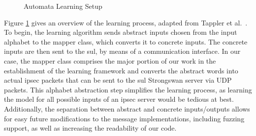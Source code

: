 \begin{figure}[h]
	\caption{Automata Learning Setup}
	\label{fig:AALSetup}
\end{figure}

Figure \ref{fig:AALSetup} gives an overview of the learning process, adapted from Tappler et al.~\cite{tappler2017}. To begin, the learning algorithm sends abstract inputs chosen from the input alphabet to the mapper class, which converts it to concrete inputs. The concrete inputs are then sent to the \ac{sul}, by means of a communication interface. In our case, the mapper class comprises the major portion of our work in the establishment of the learning framework and converts the abstract words into actual \ac{ipsec} packets that can be sent to the \ac{sul} Strongswan server via UDP packets. This alphabet abstraction step simplifies the learning process, as learning the model for all possible inputs of an \ac{ipsec} server would be tedious at best. Additionally, the separation between abstract and concrete inputs/outputs allows for easy future modifications to the message implementations, including fuzzing support, as well as increasing the readability of our code. 


